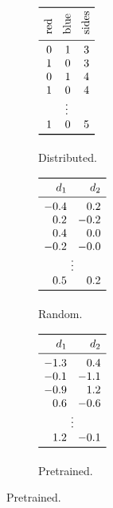 \documentclass{article}
\begin{document}
\begin{figure}[t!]
\begin{subfigure}[t]{0.25\textwidth}
\end{subfigure}
\hfill
\begin{subfigure}[t]{0.14\textwidth}
 \centering
 \renewcommand{\arraystretch}{1.18}
 $\begin{array}[b]{*{3}{r}}
   \toprule
   \rotatebox{90}{red} & \rotatebox{90}{blue} & \rotatebox{90}{sides}\\
   \midrule
   0 & 1 & 3  \\
   1 & 0 & 3  \\
   0 & 1 & 4  \\
   1 & 0 & 4 \\
   \multicolumn{3}{c}{\vdots} \\
   1 & 0 & 5 \\
   \bottomrule
 \end{array}$
 \caption{Distributed.}
 \label{fig:reps:symbolic}
\end{subfigure}
\hfill
\begin{subfigure}[t]{0.2\textwidth}
 \centering
 \renewcommand{\arraystretch}{1.18}
 $\begin{array}[b]{rr}
   \toprule
   d_{1} & d_{2} \\
   \midrule
   -0.4 &  0.2 \\
   0.2 &  -0.2 \\
   0.4 &  0.0 \\
   -0.2 &  -0.0 \\
   \multicolumn{2}{c}{\vdots} \\
   0.5 &  0.2 \\
   \bottomrule
 \end{array}$
 \caption{Random.}
 \label{fig:reps:random}
\end{subfigure}
\hfill
\begin{subfigure}[t]{0.2\textwidth}
 \centering
 \renewcommand{\arraystretch}{1.18}
 $\begin{array}[b]{rr}
   \toprule
   d_{1} & d_{2} \\
   \midrule
   -1.3 &  0.4 \\
   -0.1 &  -1.1 \\
   -0.9 &  1.2 \\
   0.6 &  -0.6 \\
   \multicolumn{2}{c}{\vdots} \\
   1.2 &  -0.1 \\
   \bottomrule
 \end{array}$
 \caption{Pretrained.}
 \label{fig:reps:pretrained}
\end{subfigure}


\end{figure}
\end{document}
